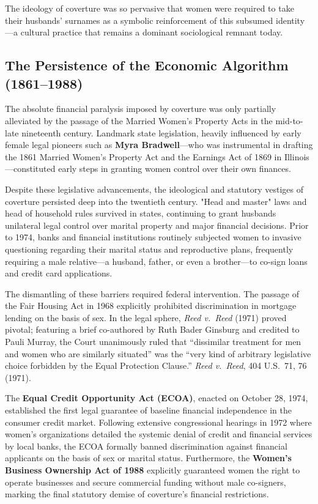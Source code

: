 The ideology of coverture was so pervasive that women were required to take their husbands' surnames as a symbolic reinforcement of this subsumed identity---a cultural practice that remains a dominant sociological remnant today.

\subsection{The Persistence of the Economic Algorithm (1861--1988)}

The absolute financial paralysis imposed by coverture was only partially alleviated by the passage of the Married Women’s Property Acts in the mid-to-late nineteenth century. Landmark state legislation, heavily influenced by early female legal pioneers such as \textbf{Myra Bradwell}---who was instrumental in drafting the 1861 Married Women’s Property Act and the Earnings Act of 1869 in Illinois---constituted early steps in granting women control over their own finances. 

Despite these legislative advancements, the ideological and statutory vestiges of coverture persisted deep into the twentieth century. "Head and master" laws and head of household rules survived in states, continuing to grant husbands unilateral legal control over marital property and major financial decisions. Prior to 1974, banks and financial institutions routinely subjected women to invasive questioning regarding their marital status and reproductive plans, frequently requiring a male relative---a husband, father, or even a brother---to co-sign loans and credit card applications.

The dismantling of these barriers required federal intervention. The passage of the Fair Housing Act in 1968 explicitly prohibited discrimination in mortgage lending on the basis of sex. In the legal sphere, \textit{Reed v.\ Reed} (1971) \cite{reed_v_reed} proved pivotal; featuring a brief co-authored by Ruth Bader Ginsburg and credited to Pauli Murray, the Court unanimously ruled that ``dissimilar treatment for men and women who are similarly situated'' was the ``very kind of arbitrary legislative choice forbidden by the Equal Protection Clause.'' \textit{Reed v.\ Reed}, 404 U.S.\ 71, 76 (1971).

The \textbf{Equal Credit Opportunity Act (ECOA)}, enacted on October 28, 1974, established the first legal guarantee of baseline financial independence in the consumer credit market. Following extensive congressional hearings in 1972 where women's organizations detailed the systemic denial of credit and financial services by local banks, the ECOA formally banned discrimination against financial applicants on the basis of sex or marital status. Furthermore, the \textbf{Women’s Business Ownership Act of 1988} explicitly guaranteed women the right to operate businesses and secure commercial funding without male co-signers, marking the final statutory demise of coverture's financial restrictions.

